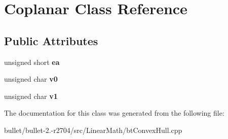 \hypertarget{class_coplanar}{\section{Coplanar Class Reference}
\label{class_coplanar}
}
\subsection*{Public Attributes}
\begin{DoxyCompactItemize}
\item 
\hypertarget{class_coplanar_a50a8f1e8391f6a471752dc8e1c67ed49}{unsigned short {\bfseries ea}}\label{class_coplanar_a50a8f1e8391f6a471752dc8e1c67ed49}

\item 
\hypertarget{class_coplanar_a561deee71b84a9b8821085a3f7b8e426}{unsigned char {\bfseries v0}}\label{class_coplanar_a561deee71b84a9b8821085a3f7b8e426}

\item 
\hypertarget{class_coplanar_ae1d2ce847db893859e6e4dba0825b2e7}{unsigned char {\bfseries v1}}\label{class_coplanar_ae1d2ce847db893859e6e4dba0825b2e7}

\end{DoxyCompactItemize}


The documentation for this class was generated from the following file\+:\begin{DoxyCompactItemize}
\item 
bullet/bullet-\/2.-\/r2704/src/\+Linear\+Math/bt\+Convex\+Hull.\+cpp\end{DoxyCompactItemize}
